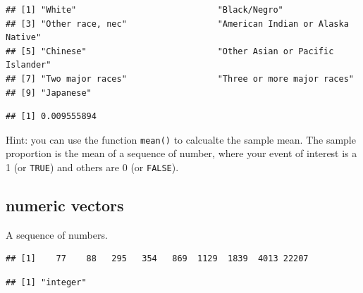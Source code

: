\documentclass[
]{book}
\newenvironment{Shaded}{\begin{snugshade}}{\end{snugshade}}
\newcommand{\KeywordTok}[1]{\textcolor[rgb]{0.13,0.29,0.53}{\textbf{#1}}}
\newcommand{\NormalTok}[1]{#1}
\newcommand{\OperatorTok}[1]{\textcolor[rgb]{0.81,0.36,0.00}{\textbf{#1}}}
\newcommand{\StringTok}[1]{\textcolor[rgb]{0.31,0.60,0.02}{#1}}
\theoremstyle{definition}
\theoremstyle{definition}
\theoremstyle{definition}
\theoremstyle{definition}
\theoremstyle{remark}
\begin{document}
\begin{verbatim}
## [1] "White"                            "Black/Negro"                     
## [3] "Other race, nec"                  "American Indian or Alaska Native"
## [5] "Chinese"                          "Other Asian or Pacific Islander" 
## [7] "Two major races"                  "Three or more major races"       
## [9] "Japanese"
\end{verbatim}

\begin{Shaded}
\end{Shaded}

\begin{verbatim}
## [1] 0.009555894
\end{verbatim}

Hint: you can use the function \texttt{mean()} to calcualte the sample mean. The sample proportion is the mean of a sequence of number, where your event of interest is a 1 (or \texttt{TRUE}) and others are 0 (or \texttt{FALSE}).

\hypertarget{numeric-vectors}{%
\subsection{numeric vectors}\label{numeric-vectors}}

A sequence of numbers.

\begin{Shaded}
\end{Shaded}

\begin{verbatim}
## [1]    77    88   295   354   869  1129  1839  4013 22207
\end{verbatim}

\begin{Shaded}
\end{Shaded}

\begin{verbatim}
## [1] "integer"
\end{verbatim}
\end{document}
